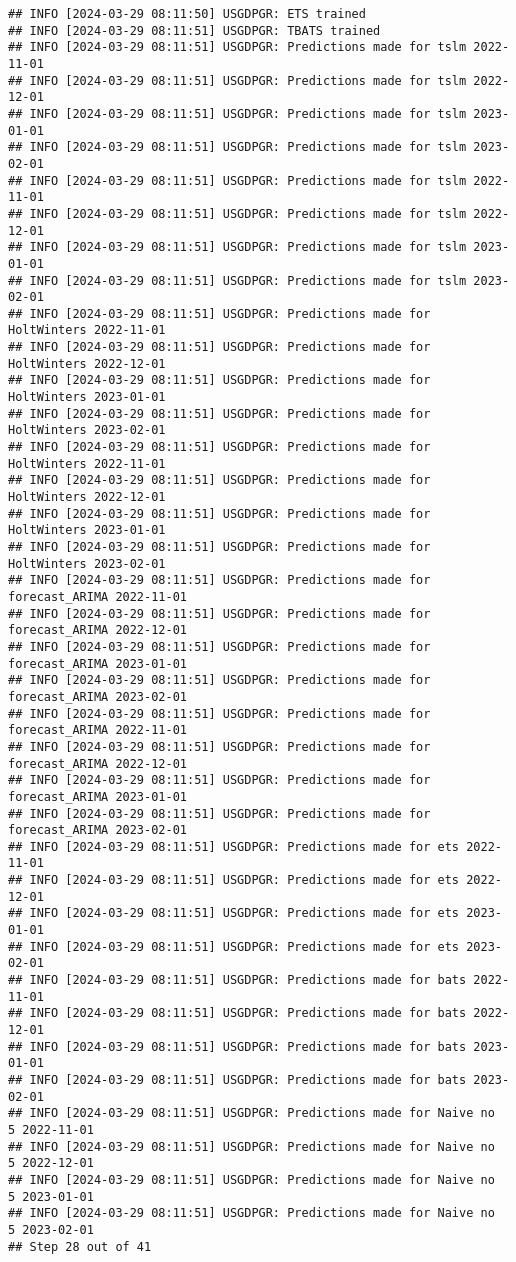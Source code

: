 \documentclass[
]{article}
\begin{document}
\begin{verbatim}
## INFO [2024-03-29 08:11:50] USGDPGR: ETS trained
## INFO [2024-03-29 08:11:51] USGDPGR: TBATS trained
## INFO [2024-03-29 08:11:51] USGDPGR: Predictions made for tslm 2022-11-01
## INFO [2024-03-29 08:11:51] USGDPGR: Predictions made for tslm 2022-12-01
## INFO [2024-03-29 08:11:51] USGDPGR: Predictions made for tslm 2023-01-01
## INFO [2024-03-29 08:11:51] USGDPGR: Predictions made for tslm 2023-02-01
## INFO [2024-03-29 08:11:51] USGDPGR: Predictions made for tslm 2022-11-01
## INFO [2024-03-29 08:11:51] USGDPGR: Predictions made for tslm 2022-12-01
## INFO [2024-03-29 08:11:51] USGDPGR: Predictions made for tslm 2023-01-01
## INFO [2024-03-29 08:11:51] USGDPGR: Predictions made for tslm 2023-02-01
## INFO [2024-03-29 08:11:51] USGDPGR: Predictions made for HoltWinters 2022-11-01
## INFO [2024-03-29 08:11:51] USGDPGR: Predictions made for HoltWinters 2022-12-01
## INFO [2024-03-29 08:11:51] USGDPGR: Predictions made for HoltWinters 2023-01-01
## INFO [2024-03-29 08:11:51] USGDPGR: Predictions made for HoltWinters 2023-02-01
## INFO [2024-03-29 08:11:51] USGDPGR: Predictions made for HoltWinters 2022-11-01
## INFO [2024-03-29 08:11:51] USGDPGR: Predictions made for HoltWinters 2022-12-01
## INFO [2024-03-29 08:11:51] USGDPGR: Predictions made for HoltWinters 2023-01-01
## INFO [2024-03-29 08:11:51] USGDPGR: Predictions made for HoltWinters 2023-02-01
## INFO [2024-03-29 08:11:51] USGDPGR: Predictions made for forecast_ARIMA 2022-11-01
## INFO [2024-03-29 08:11:51] USGDPGR: Predictions made for forecast_ARIMA 2022-12-01
## INFO [2024-03-29 08:11:51] USGDPGR: Predictions made for forecast_ARIMA 2023-01-01
## INFO [2024-03-29 08:11:51] USGDPGR: Predictions made for forecast_ARIMA 2023-02-01
## INFO [2024-03-29 08:11:51] USGDPGR: Predictions made for forecast_ARIMA 2022-11-01
## INFO [2024-03-29 08:11:51] USGDPGR: Predictions made for forecast_ARIMA 2022-12-01
## INFO [2024-03-29 08:11:51] USGDPGR: Predictions made for forecast_ARIMA 2023-01-01
## INFO [2024-03-29 08:11:51] USGDPGR: Predictions made for forecast_ARIMA 2023-02-01
## INFO [2024-03-29 08:11:51] USGDPGR: Predictions made for ets 2022-11-01
## INFO [2024-03-29 08:11:51] USGDPGR: Predictions made for ets 2022-12-01
## INFO [2024-03-29 08:11:51] USGDPGR: Predictions made for ets 2023-01-01
## INFO [2024-03-29 08:11:51] USGDPGR: Predictions made for ets 2023-02-01
## INFO [2024-03-29 08:11:51] USGDPGR: Predictions made for bats 2022-11-01
## INFO [2024-03-29 08:11:51] USGDPGR: Predictions made for bats 2022-12-01
## INFO [2024-03-29 08:11:51] USGDPGR: Predictions made for bats 2023-01-01
## INFO [2024-03-29 08:11:51] USGDPGR: Predictions made for bats 2023-02-01
## INFO [2024-03-29 08:11:51] USGDPGR: Predictions made for Naive no  5 2022-11-01
## INFO [2024-03-29 08:11:51] USGDPGR: Predictions made for Naive no  5 2022-12-01
## INFO [2024-03-29 08:11:51] USGDPGR: Predictions made for Naive no  5 2023-01-01
## INFO [2024-03-29 08:11:51] USGDPGR: Predictions made for Naive no  5 2023-02-01
## Step 28 out of 41
\end{verbatim}
\end{document}
